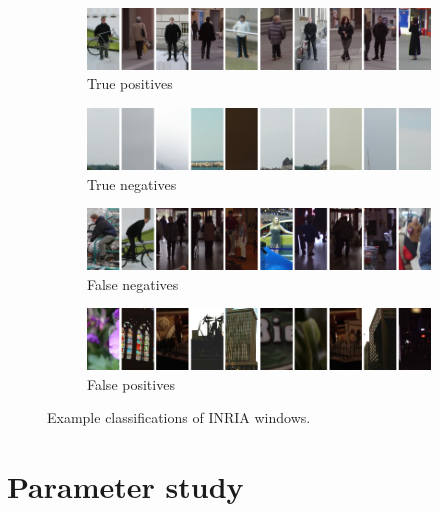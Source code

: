 \documentclass[thesis.tex]{subfiles}
\begin{document}
\begin{figure}
	\centering
	\begin{subfigure}[t]{\textwidth}
		\includegraphics[width=\textwidth]{img/objectDetectionTP.png}
		\caption{True positives}
		\label{fig:objectDetectionTP}
		\vspace{2mm}
	\end{subfigure}
	\begin{subfigure}[t]{\textwidth}
		\includegraphics[width=\textwidth]{img/objectDetectionTN.png}
		\caption{True negatives}
		\label{fig:objectDetectionTN}
		\vspace{2mm}
	\end{subfigure}
	\begin{subfigure}[t]{\textwidth}
		\includegraphics[width=\textwidth]{img/objectDetectionFN.png}
		\caption{False negatives}
		\label{fig:objectDetectionFN}
		\vspace{2mm}
	\end{subfigure}
	\begin{subfigure}[t]{\textwidth}
		\includegraphics[width=\textwidth]{img/objectDetectionFP.png}
		\caption{False positives}
		\label{fig:objectDetectionFP}
	\end{subfigure}
	\caption{Example classifications of INRIA windows.}
	\label{fig:imageCorrespondenceCurves}
\end{figure}
\restoregeometry

\section{Parameter study}
\label{sec:odParameterStudy}

\subbibliography
\end{document}

